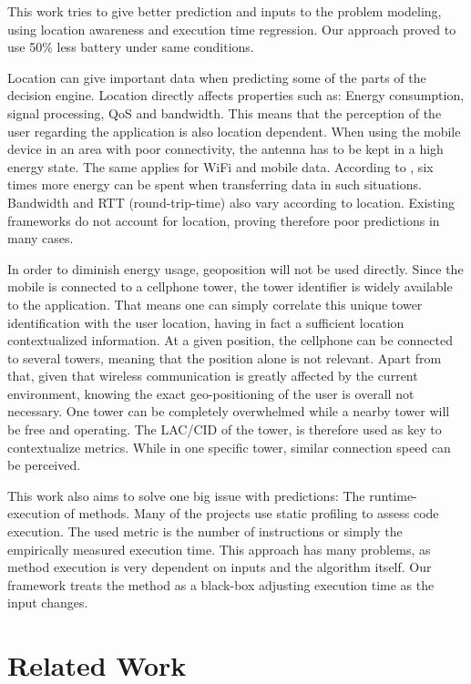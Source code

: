 \documentclass[10pt, conference, letterpaper]{IEEEtran}
\begin{document}
  This work tries to give better prediction and inputs to the problem modeling, using location awareness and execution time regression. Our approach proved to use 50\% less battery under same conditions.
  
  Location can give important data when predicting some of the parts of the decision engine. Location directly affects properties such as: Energy consumption, signal processing, QoS and bandwidth. This means that the perception of the user regarding the application is also location dependent. When using the mobile device in an area with poor connectivity, the antenna has to be kept in a high energy state. The same applies for WiFi and mobile data. According to \cite{Schulman10bartendr:a}, six times more energy can be spent when transferring data in such situations. Bandwidth and RTT (round-trip-time) also vary according to location. Existing frameworks do not account for location, proving therefore poor predictions in many cases.
  
  In order to diminish energy usage, geoposition will not be used directly. Since the mobile is connected to a cellphone tower, the tower identifier is widely available to the application. That means one can simply correlate this unique tower identification with the user location, having in fact a sufficient location contextualized information. At a given position, the cellphone can be connected to several towers, meaning that the position alone is not relevant. Apart from that, given that wireless communication is greatly affected by the current environment, knowing the exact geo-positioning of the user is overall not necessary. One tower can be completely overwhelmed while a nearby tower will be free and operating. The LAC/CID of the tower, is therefore used as key to contextualize metrics. While in one specific tower, similar connection speed can be perceived.

  This work also aims to solve one big issue with predictions: The runtime-execution of methods. Many of the projects use static profiling to assess code execution. The used metric is the number of instructions or simply the empirically measured execution time. This approach has many problems, as method execution is very dependent on inputs and the algorithm itself. Our framework treats the method as a black-box adjusting execution time as the input changes.

  \section{Related Work}
\end{document}
